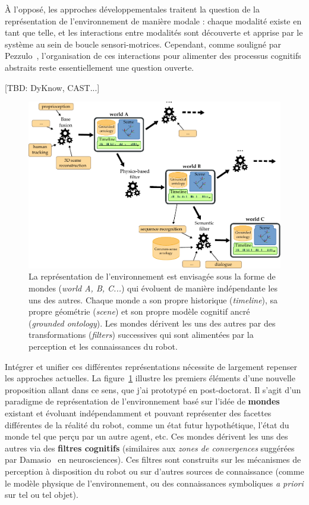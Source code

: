 \documentclass[a4paper]{article}
\begin{document}
À l'opposé, les approches développementales traitent la question de la
représentation de l'environnement de manière modale : chaque modalité existe en
tant que telle, et les interactions entre modalités sont découverte et apprise
par le système au sein de boucle sensori-motrices. Cependant, comme souligné
par Pezzulo~\cite{pezzulo2012computational}, l'organisation de ces interactions
pour alimenter des processus cognitifs abstraits reste essentiellement une
question ouverte.

[TBD: DyKnow, CAST...]

\begin{figure}
    \centering
\includegraphics[width=1.0\textwidth]{figs/worlds}
\caption{\small La représentation de l'environnement est envisagée sous la forme
    de mondes (\emph{world A, B, C...}) qui évoluent de manière indépendante les
    uns des autres. Chaque monde a son propre historique (\emph{timeline}), sa
    propre géométrie (\emph{scene}) et son propre modèle cognitif ancré
    (\emph{grounded ontology}).  Les mondes dérivent les uns des autres par des
    transformations (\emph{filters}) successives qui sont alimentées par la
    perception et les connaissances du robot.  }

\label{worlds}
\end{figure}

Intégrer et unifier ces différentes représentations nécessite de largement
repenser les approches actuelles. La figure~\ref{worlds} illustre les premiers
éléments d'une nouvelle proposition allant dans ce sens, que j'ai prototypé en
post-doctorat. Il s'agit d'un paradigme de représentation de l'environnement
basé sur l'idée de \textbf{mondes} existant et évoluant indépendamment et
pouvant représenter des facettes différentes de la réalité du robot, comme un
état futur hypothétique, l'état du monde tel que perçu par un autre agent,
etc. Ces mondes dérivent les uns des autres via des \textbf{filtres cognitifs}
(similaires aux \emph{zones de convergences} suggérées par
Damasio~\cite{damasio1989time} en neurosciences). Ces filtres sont construits
sur les mécanismes de perception à disposition du robot ou sur d'autres sources de
connaissance (comme le modèle physique de l'environnement, ou des connaissances
symboliques \textit{a priori} sur tel ou tel objet).
\end{document}
